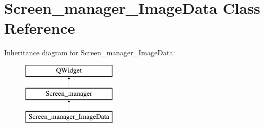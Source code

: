 \hypertarget{classScreen__manager__ImageData}{}\section{Screen\+\_\+manager\+\_\+\+Image\+Data Class Reference}
\label{classScreen__manager__ImageData}
Inheritance diagram for Screen\+\_\+manager\+\_\+\+Image\+Data\+:\begin{figure}[H]
\begin{center}
\leavevmode
\includegraphics[height=3.000000cm]{classScreen__manager__ImageData}
\end{center}
\end{figure}
